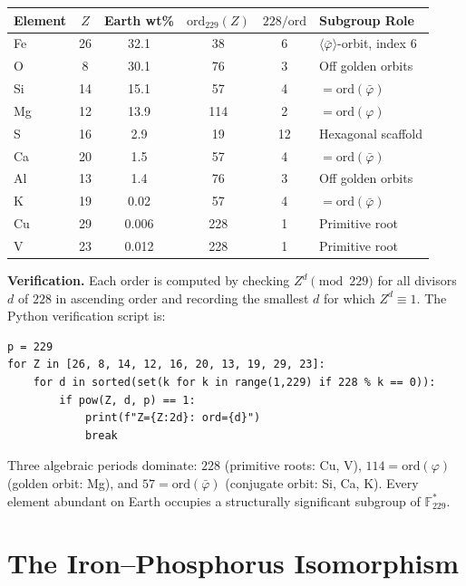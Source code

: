 \documentclass[12pt]{article}
\theoremstyle{principia}
\theoremstyle{definition}
\theoremstyle{remark}
\providecommand{\FF}{\mathbb{F}}
\providecommand{\vp}{\varphi}
\providecommand{\vpbar}{\bar{\varphi}}
\begin{document}
\begin{center}
\begin{tabular}{@{}lccccl@{}}
\toprule
\textbf{Element} & $Z$ & \textbf{Earth wt\%} & $\mathrm{ord}_{229}(Z)$ & $228 / \mathrm{ord}$ & \textbf{Subgroup Role} \\
\midrule
Fe & 26 & 32.1 & 38  & 6  & $\langle\vpbar\rangle$-orbit, index 6 \\
O  & 8  & 30.1 & 76  & 3  & Off golden orbits \\
Si & 14 & 15.1 & 57  & 4  & $= \mathrm{ord}(\vpbar)$ \\
Mg & 12 & 13.9 & 114 & 2  & $= \mathrm{ord}(\vp)$ \\
S  & 16 & 2.9  & 19  & 12 & Hexagonal scaffold \\
Ca & 20 & 1.5  & 57  & 4  & $= \mathrm{ord}(\vpbar)$ \\
Al & 13 & 1.4  & 76  & 3  & Off golden orbits \\
K  & 19 & 0.02 & 57  & 4  & $= \mathrm{ord}(\vpbar)$ \\
Cu & 29 & 0.006 & 228 & 1 & Primitive root \\
V  & 23 & 0.012 & 228 & 1 & Primitive root \\
\bottomrule
\end{tabular}
\end{center}

\noindent\textbf{Verification.} Each order is computed by checking $Z^d \pmod{229}$ for all divisors $d$ of $228$ in ascending order and recording the smallest $d$ for which $Z^d \equiv 1$. The Python verification script is:

\begin{verbatim}
p = 229
for Z in [26, 8, 14, 12, 16, 20, 13, 19, 29, 23]:
    for d in sorted(set(k for k in range(1,229) if 228 % k == 0)):
        if pow(Z, d, p) == 1:
            print(f"Z={Z:2d}: ord={d}")
            break
\end{verbatim}

\noindent Three algebraic periods dominate: $228$ (primitive roots: Cu, V), $114 = \mathrm{ord}(\vp)$ (golden orbit: Mg), and $57 = \mathrm{ord}(\vpbar)$ (conjugate orbit: Si, Ca, K). Every element abundant on Earth occupies a structurally significant subgroup of $\FF_{229}^*$.

\section{The Iron--Phosphorus Isomorphism}\label{sec:fep}
\end{document}
